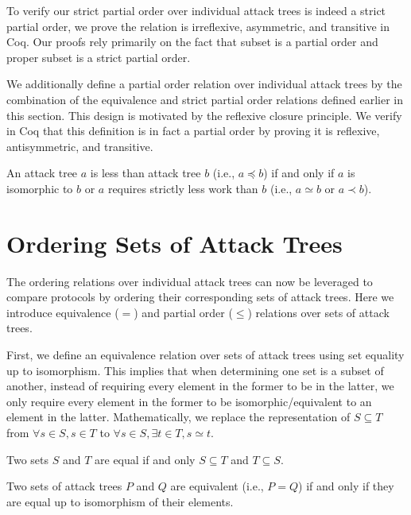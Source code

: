\documentclass[runningheads]{llncs}
\theoremstyle{definition}
\begin{document}
To verify our strict partial order over individual attack trees is
indeed a strict partial order, we prove the relation is irreflexive,
asymmetric, and transitive in Coq. Our proofs rely primarily on the
fact that subset is a partial order and proper subset is a strict
partial order.

We additionally define a partial order relation over individual attack
trees by the combination of the equivalence and strict partial order
relations defined earlier in this section. This design is motivated by
the reflexive closure principle. We verify in Coq that this definition
is in fact a partial order by proving it is reflexive, antisymmetric,
and transitive.

\begin{definition}
  An attack tree $a$ is less than attack tree $b$ (i.e., $a \preceq
  b$) if and only if $a$ is isomorphic to $b$ or $a$ requires strictly
  less work than $b$ (i.e., $a \simeq b$ or $a \prec b$). 
\end{definition}


\section{Ordering Sets of Attack Trees}

The ordering relations over individual attack trees can now be
leveraged to compare protocols by ordering their corresponding sets of
attack trees. Here we introduce equivalence ($=$) and partial order
($\le$) relations over sets of attack trees.

First, we define an equivalence relation over sets of attack trees
using set equality up to isomorphism. This implies that when
determining one set is a subset of another, instead of requiring every
element in the former to be in the latter, we only require every
element in the former to be isomorphic/equivalent to an element in the
latter. Mathematically, we replace the representation of
$S \subseteq T$ from $\forall s \in S, s \in T$ to
$\forall s \in S, \exists t \in T, s \simeq t$.

\begin{definition}
  Two sets $S$ and $T$ are equal if and only $S \subseteq T$ and $T
  \subseteq S$. 
\end{definition}

\begin{definition}[Equivalence =]
  Two sets of attack trees $P$ and $Q$ are equivalent (i.e., $P =
  Q$) if and only if they are equal up to isomorphism of their
  elements.
\end{definition}
\end{document}
